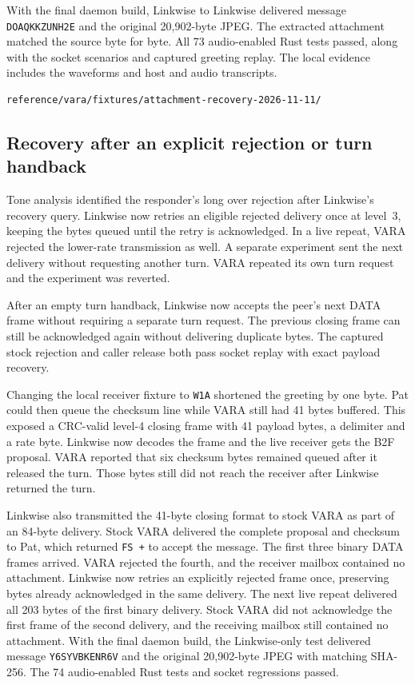 \documentclass[11pt,a4paper]{article}
\begin{document}
With the final daemon build, Linkwise to Linkwise delivered message
\texttt{DOAQKKZUNH2E} and the original 20,902-byte JPEG. The
extracted attachment matched the source byte for byte. All 73
audio-enabled Rust tests passed, along with the socket scenarios
and captured greeting replay. The local evidence includes the
waveforms and host and audio transcripts.

\begin{lstlisting}
reference/vara/fixtures/attachment-recovery-2026-11-11/
\end{lstlisting}

\subsection{Recovery after an explicit rejection or turn handback}

Tone analysis identified the responder's long over rejection after
Linkwise's recovery query. Linkwise now retries an eligible rejected
delivery once at level~3, keeping the bytes queued until the retry
is acknowledged. In a live repeat, VARA rejected the lower-rate
transmission as well. A separate experiment sent the next delivery
without requesting another turn. VARA repeated its own turn request
and the experiment was reverted.

After an empty turn handback, Linkwise now accepts the peer's next
DATA frame without requiring a separate turn request. The previous
closing frame can still be acknowledged again without delivering
duplicate bytes. The captured stock rejection and caller release
both pass socket replay with exact payload recovery.

Changing the local receiver fixture to \texttt{W1A} shortened the
greeting by one byte. Pat could then queue the checksum line while
VARA still had 41 bytes buffered. This exposed a CRC-valid level-4
closing frame with 41 payload bytes, a delimiter and a rate byte.
Linkwise now decodes the frame and the live receiver gets the B2F
proposal. VARA reported that six checksum bytes remained queued
after it released the turn. Those bytes still did not reach the
receiver after Linkwise returned the turn.

Linkwise also transmitted the 41-byte closing format to stock VARA
as part of an 84-byte delivery. Stock VARA delivered the complete
proposal and checksum to Pat, which returned \texttt{FS +} to accept
the message. The first three binary DATA frames arrived. VARA
rejected the fourth, and the receiver mailbox contained no
attachment. Linkwise now retries an explicitly rejected frame
once, preserving bytes already acknowledged in the same delivery.
The next live repeat delivered all 203 bytes of the first binary
delivery. Stock VARA did not acknowledge the first frame of the
second delivery, and the receiving mailbox still contained no
attachment. With the final daemon build, the Linkwise-only test
delivered message \texttt{Y6SYVBKENR6V} and the original 20,902-byte
JPEG with matching SHA-256. The 74 audio-enabled Rust tests and
socket regressions passed.
\end{document}
